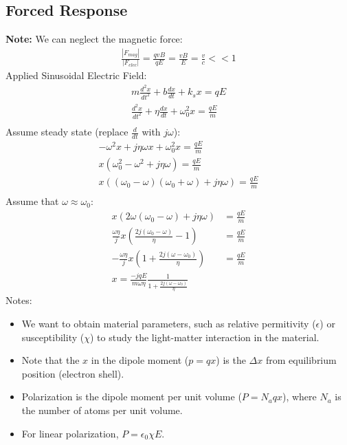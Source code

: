 \documentclass[11pt]{article}
\begin{document}
\subsection{Forced Response}
\textbf{Note:} We can neglect the magnetic force:
    \begin{align*}
        \frac{|F_{mag}|}{|F_{elec}|} = \frac{qvB}{qE} = \frac{vB}{E} = \frac{v}{c} << 1
    \end{align*}
Applied Sinusoidal Electric Field:
\begin{align*}
    m\frac{d^2x}{dt^2} + b\frac{dx}{dt} + k_sx = qE \\
    \frac{d^2x}{dt^2} + \eta\frac{dx}{dt} + \omega_0^2 x = \frac{qE}{m} \\
\end{align*}
Assume steady state (replace $\frac{d}{dt}$ with $j\omega$):
\begin{align*}
    -\omega^2x + j\eta\omega x + \omega_0^2 x = \frac{qE}{m} \\
    x(\omega_0^2 - \omega^2 + j\eta\omega) = \frac{qE}{m} \\
    x ((\omega_0 - \omega)(\omega_0 + \omega) + j\eta\omega) = \frac{qE}{m} \\
\end{align*}
Assume that $\omega \approx \omega_0$:
\begin{align*}
    x\left( 2\omega(\omega_0 - \omega) + j\eta\omega \right) &= \frac{qE}{m} \\
    \frac{\omega \eta}{j}x \left( \frac{2j(\omega_0 - \omega)}{\eta} - 1 \right) &= \frac{qE}{m} \\
    -\frac{\omega \eta}{j}x \left( 1 + \frac{2j(\omega - \omega_0)}{\eta} \right) &= \frac{qE}{m} \\
    x = \frac{-jqE}{m\omega\eta} \frac{1}{1 + \frac{2j(\omega - \omega_0)}{\eta}}
\end{align*}
Notes:
\begin{itemize}
    \item We want to obtain material parameters, such as relative permitivity ($\epsilon$) or susceptibility ($\chi$) to study the light-matter interaction in the material.
    \item Note that the $x$ in the dipole moment ($p=qx$) is the $\Delta x$ from equilibrium position (electron shell).
    \item Polarization is the dipole moment per unit volume ($P = N_aqx$), where $N_a$ is the number of atoms per unit volume.
    \item For linear polarization, $P = \epsilon_0\chi E$.
\end{itemize}
\end{document}
